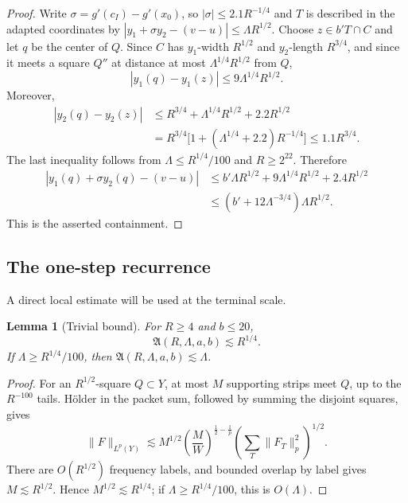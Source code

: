 \documentclass[11pt,letterpaper]{amsart}
\newtheorem{lemma}[lemma]{Lemma}
\begin{document}
\begin{proof}
Write $\sigma=g'(c_I)-g'(x_0)$, so $|\sigma|\le2.1R^{-1/4}$ and
$T$ is described in the adapted coordinates by
$|y_1+\sigma y_2-(v-u)|\le\Lambda R^{1/2}$.  Choose
$z\in b'T\cap C$ and let $q$ be the center of $Q$.  Since $C$ has
$y_1$-width $R^{1/2}$ and $y_2$-length $R^{3/4}$, and since it meets a
square $Q''$ at distance at most $\Lambda^{1/4}R^{1/2}$ from $Q$,
\[
 |y_1(q)-y_1(z)|\le9\Lambda^{1/4}R^{1/2}.
\]
Moreover,
\begin{align*}
 |y_2(q)-y_2(z)|
 &\le R^{3/4}+\Lambda^{1/4}R^{1/2}+2.2R^{1/2}\\
 &=R^{3/4}\bigl[1+(\Lambda^{1/4}+2.2)R^{-1/4}\bigr]
 \le1.1R^{3/4}.
\end{align*}
The last inequality follows from
$\Lambda\le R^{1/4}/100$ and $R\ge2^{22}$.
Therefore
\begin{align*}
 |y_1(q)+\sigma y_2(q)-(v-u)|
 &\le b'\Lambda R^{1/2}
      +9\Lambda^{1/4}R^{1/2}
      +2.4R^{1/2}\\
 &\le(b'+12\Lambda^{-3/4})\Lambda R^{1/2}.
\end{align*}
This is the asserted containment.
\end{proof}

\subsection{The one-step recurrence}
\label{app:proof-refined}

A direct local estimate will be used at the terminal scale.

\begin{lemma}[Trivial bound]
\label{lem:appendix-trivial}
For $R\ge4$ and $b\le20$,
\[
 \mathfrak A(R,\Lambda,a,b)\lesssim R^{1/4}.
\]
If $\Lambda\ge R^{1/4}/100$, then
$\mathfrak A(R,\Lambda,a,b)\lesssim\Lambda$.
\end{lemma}

\begin{proof}
For an $R^{1/2}$-square $Q\subset Y$, at most $M$ supporting strips meet
$Q$, up to the $R^{-100}$ tails.  H\"older in the packet sum, followed by
summing the disjoint squares, gives
\[
 \|F\|_{L^p(Y)}
 \lesssim M^{1/2}
 \left(\frac{M}{W}\right)^{\frac12-\frac1p}
 \left(\sum_T\|F_T\|_p^2\right)^{1/2}.
\]
There are $O(R^{1/2})$ frequency labels, and bounded overlap by label gives
$M\lesssim R^{1/2}$.  Hence $M^{1/2}\lesssim R^{1/4}$; if
$\Lambda\ge R^{1/4}/100$, this is $O(\Lambda)$.
\end{proof}
\end{document}
